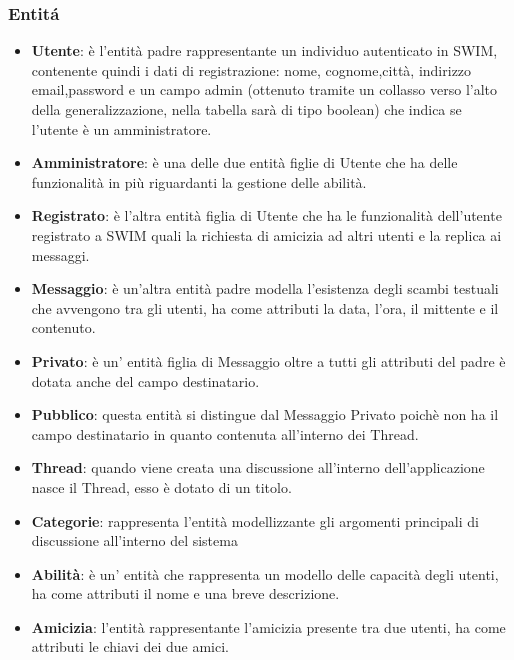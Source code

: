 \subsubsection{Entit\'a}
\begin{itemize}
 \item {\bfseries Utente}: è l'entità padre rappresentante un individuo autenticato in SWIM,  contenente quindi i dati di registrazione: nome, cognome,città, indirizzo email,password e un campo admin (ottenuto tramite un collasso verso l'alto della generalizzazione, nella tabella sarà di tipo boolean) che indica se l'utente è un amministratore.
 \item {\bfseries Amministratore}: è una delle due entità figlie di Utente che ha delle funzionalità in più riguardanti la gestione delle abilità.
 \item {\bfseries Registrato}: è l'altra entità figlia di Utente che ha le funzionalità dell'utente registrato a SWIM quali la richiesta di amicizia ad altri utenti e la replica ai messaggi.
 \item {\bfseries Messaggio}: è un'altra entità padre modella l'esistenza degli scambi testuali che avvengono tra gli utenti, ha come attributi la data, l'ora, il mittente e il contenuto.
\item {\bfseries Privato}: è un' entità figlia di Messaggio oltre a tutti gli attributi del padre è dotata anche del campo destinatario.
\item {\bfseries Pubblico}: questa entità si distingue dal Messaggio Privato poichè non ha il campo destinatario in quanto contenuta all'interno dei Thread.
\item {\bfseries Thread}: quando viene creata una discussione all'interno dell'applicazione nasce il Thread, esso è dotato di un titolo. 
\item {\bfseries Categorie}: rappresenta l'entità modellizzante gli argomenti principali di discussione all'interno del sistema 
\item {\bfseries Abilità}: è un' entità che rappresenta un modello delle capacità degli utenti, ha come attributi il nome e una breve descrizione. 
\item {\bfseries Amicizia}: l'entità rappresentante l'amicizia presente tra due utenti, ha come attributi le chiavi dei due amici.
\end{itemize}

